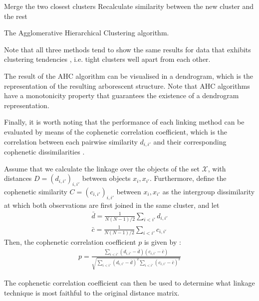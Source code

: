 \documentclass[../main.tex]{subfiles}
\begin{document}
\begin{algorithm}
\begin{algorithmic}[1]
\Repeat
\State Merge the two closest clusters
\State Recalculate similarity between the new cluster and the rest
\EndFunction
\caption{The Agglomerative Hierarchical Clustering algorithm.}\label{alg_ahc}
\end{algorithmic}
\end{algorithm}
\par Note that all three methods tend to show the same results for data that exhibits clustering tendencies \cite{hastie2008}, i.e. tight clusters well apart from each other.
\par The result of the AHC algorithm can be visualised in a dendrogram, which is the representation of the resulting arborescent structure. Note that AHC algorithms have a monotonicity property that guarantees the existence of a dendrogram representation.
\par Finally, it is worth noting that the performance of each linking method can be evaluated by means of the cophenetic correlation coefficient, which is the correlation between each pairwise similarity $d_{i,i'}$ and their corresponding cophenetic dissimilarities \cite{hastie2008}. 
\par Assume that we calculate the linkage over the objects of the set $\mathcal{X}$, with distances $D = (d_{i, i'})_{i, i'}$ between objects $x_i, x_{i'}$. Furthermore, define the cophenetic similarity $C = (c_{i,i'})_{i, i'}$ between $x_i, x_{i'}$ as the intergroup dissimilarity at which both observations are first joined in the same cluster, and let
\begin{align*}
\bar{d} = \frac{1}{N(N-1)/2}\sum_{i < i'} d_{i, i'}\\
\bar{c} = \frac{1}{N(N-1)/2}\sum_{i < i'} c_{i, i'}
\end{align*}
Then, the cophenetic correlation coefficient $p$ is given by \cite{Mathworks2015a}:
\begin{align*}
p = \frac{\sum_{i < i'}(d_{i, i'} - \bar{d})(c_{i, i'} - \bar{c})}{\sqrt{\sum_{i < i'}(d_{i, i'} - \bar{d})^2\sum_{i < i'}(c_{i,i'} - \bar{c})^2}}
\end{align*}
\par The cophenetic correlation coefficient can then be used to determine what linkage technique is most faithful to the original distance matrix.
\end{document}
